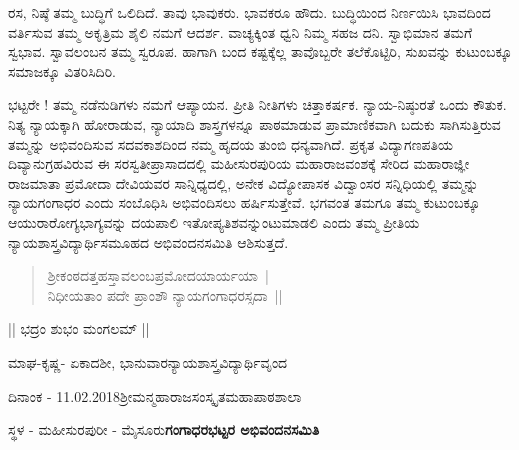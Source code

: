 ರಸ, ನಿಷ್ಠೆ ತಮ್ಮ ಬುದ್ಧಿಗೆ ಒಲಿದಿದೆ. ತಾವು ಭಾವುಕರು. ಭಾವಕರೂ ಹೌದು. ಬುದ್ಧಿಯಿಂದ ನಿರ್ಣಯಿಸಿ ಭಾವದಿಂದ ವರ್ತಿಸುವ ತಮ್ಮ ಅಕೃತ್ರಿಮ ಶೈಲಿ ನಮಗೆ ಆದರ್ಶ. ವಾಚ್ಯಕ್ಕಿಂತ ಧ್ವನಿ ನಿಮ್ಮ ಸಹಜ ದನಿ.  ಸ್ವಾಭಿಮಾನ ತಮಗೆ ಸ್ವಭಾವ. ಸ್ವಾವಲಂಬನ ತಮ್ಮ ಸ್ವರೂಪ. ಹಾಗಾಗಿ ಬಂದ ಕಷ್ಟಕ್ಕೆಲ್ಲ ತಾವೊಬ್ಬರೇ ತಲೆಕೊಟ್ಟಿರಿ, ಸುಖವನ್ನು ಕುಟುಂಬಕ್ಕೂ ಸಮಾಜಕ್ಕೂ ವಿತರಿಸಿದಿರಿ.

ಭಟ್ಟರೇ ! ತಮ್ಮ ನಡೆನುಡಿಗಳು ನಮಗೆ ಆಪ್ಯಾಯನ. ಪ್ರೀತಿ ನೀತಿಗಳು ಚಿತ್ತಾಕರ್ಷಕ. ನ್ಯಾಯ-ನಿಷ್ಠುರತೆ ಒಂದು ಕೌತುಕ.  ನಿತ್ಯ ನ್ಯಾಯಕ್ಕಾಗಿ ಹೋರಾಡುವ, ನ್ಯಾಯಾದಿ ಶಾಸ್ತ್ರಗಳನ್ನೂ ಪಾಠಮಾಡುವ ಪ್ರಾಮಾಣಿಕವಾಗಿ ಬದುಕು ಸಾಗಿಸುತ್ತಿರುವ ತಮ್ಮನ್ನು ಅಭಿವಂದಿಸುವ ಸದವಕಾಶದಿಂದ ನಮ್ಮ ಹೃದಯ ತುಂಬಿ ಧನ್ಯವಾಗಿದೆ. ಪ್ರಕೃತ ವಿದ್ಯಾಗಣಪತಿಯ ದಿವ್ಯಾನುಗ್ರಹವಿರುವ ಈ ಸರಸ್ವತೀಪ್ರಾಸಾದದಲ್ಲಿ ಮಹೀಸುರಪುರಿಯ ಮಹಾರಾಜವಂಶಕ್ಕೆ ಸೇರಿದ ಮಹಾರಾಜ್ಞೀ ರಾಜಮಾತಾ ಪ್ರಮೋದಾ ದೇವಿಯವರ ಸಾನ್ನಿಧ್ಯದಲ್ಲಿ, ಅನೇಕ ವಿದ್ಯೋಪಾಸಕ ವಿದ್ವಾಂಸರ ಸನ್ನಿಧಿಯಲ್ಲಿ ತಮ್ಮನ್ನು ನ್ಯಾಯಗಂಗಾಧರ ಎಂದು ಸಂಬೊಧಿಸಿ ಅಭಿವಂದಿಸಲು ಹರ್ಷಿಸುತ್ತೇವೆ. ಭಗವಂತ ತಮಗೂ ತಮ್ಮ ಕುಟುಂಬಕ್ಕೂ ಆಯುರಾರೋಗ್ಯಭಾಗ್ಯವನ್ನು ದಯಪಾಲಿ ಇತೋಪ್ಯತಿಶವನ್ನುಂಟುಮಾಡಲಿ ಎಂದು ತಮ್ಮ ಪ್ರೀತಿಯ ನ್ಯಾಯಶಾಸ್ತ್ರವಿದ್ಯಾರ್ಥಿಸಮೂಹದ ಅಭಿವಂದನಸಮಿತಿ ಆಶಿಸುತ್ತದೆ.

\begin{verse}
ಶ್ರೀಕಂಠದತ್ತಹಸ್ತಾವಲಂಬಪ್ರಮೋದಯಾರ್ಯಯಾ~|\\
ನಿಧೀಯತಾಂ ಪದೇ ಪ್ರಾಂಶೌ ನ್ಯಾಯಗಂಗಾಧರಸ್ಸದಾ~||
\end{verse}

\centerline{|| ಭದ್ರಂ ಶುಭಂ ಮಂಗಲಮ್ ||}
\bigskip

ಮಾಘ-ಕೃಷ್ಣ- ಏಕಾದಶೀ, ಭಾನುವಾರ\hfill				           ನ್ಯಾಯಶಾಸ್ತ್ರವಿದ್ಯಾರ್ಥಿವೃಂದ

ದಿನಾಂಕ - 11.02.2018\hfill  						     ಶ್ರೀಮನ್ಮಹಾರಾಜಸಂಸ್ಕೃತಮಹಾಪಾಠಶಾಲಾ

ಸ್ಥಳ - ಮಹೀಸುರಪುರೀ - ಮೈಸೂರು\hfill				        \textbf{ಗಂಗಾಧರಭಟ್ಟರ ಅಭಿವಂದನಸಮಿತಿ}
